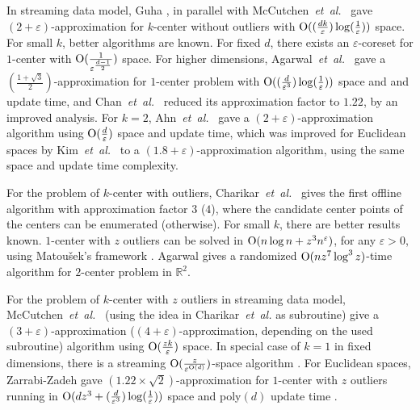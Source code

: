\documentclass[envcountsame]{cls/cccg15}
\newcommand{\cO}{\ensuremath{{\rm O}}}
\newcommand{\IR}{\ensuremath{\mathbb{R}}}
\newcommand{\eps}{\varepsilon}
\newcommand{\etal}{{\em et~al.\/}}
\begin{document}
In streaming data model, Guha \cite{guha2009tight}, in parallel with McCutchen~\etal~\cite{mccutchen2008streaming} gave $(2+\eps)$-approximation for $k$-center without outliers with $\cO((\frac{dk}{\eps}) \log(\frac{1}{\eps}))$ space.
For small $k$, better algorithms are known. For fixed $d$, there exists an $\eps$\nobreakdash-coreset for $1$-center with $\cO(\frac{1}{\eps^{\frac{d-1}{2}}})$ space.
For higher dimensions, Agarwal~\etal~\cite{agarwal2010streaming} gave a $(\frac{1+\sqrt{3}}{2})$-approximation for $1$\nobreakdash-center problem with $\cO((\frac{d}{\eps^3})\log(\frac{1}{\eps}))$ space and and update time, and Chan~\etal~\cite{chan2014streaming} reduced its approximation factor to $1.22$, by an improved analysis.
For $k=2$, Ahn~\etal~\cite{ahn2014computing} gave a $(2+\eps)$-approximation algorithm using $\cO(\frac{d}{\eps})$ space and update time, which was improved for Euclidean spaces by Kim~\etal~\cite{kim2014improved} to a $(1.8+\eps)$-approximation algorithm, using the same space and update time complexity.

For the problem of $k$-center with outliers, Charikar~\etal~\cite{charikar2001algorithms} gives the first offline algorithm with approximation factor $3$ ($4$), where the candidate center points of the centers can be enumerated (otherwise).
For small $k$, there are better results known. $1$-center with $z$ outliers can be solved in $\cO(n \log n + z^{3} n^{\eps})$, for any $\eps > 0$, using Matou{\v{s}}ek's framework \cite{matouvsek1995geometric}.
Agarwal \cite{agarwal2008efficient} gives a randomized $\cO(n z^{7} \log^3 z)$-time algorithm for $2$-center problem in $\IR^2$.

For the problem of $k$-center with $z$ outliers in streaming data model, McCutchen~\etal~\cite{mccutchen2008streaming} (using the idea in Charikar~\etal \cite{charikar2001algorithms} as subroutine) give a $(3+\eps)$-approximation ($(4+\eps)$-approximation, depending on the used subroutine) algorithm using $\cO(\frac{zk}{\eps})$ space.
In special case of $k=1$ in fixed dimensions, there is a streaming $\cO(\frac{z}{\eps^{\cO(d)}})$-space algorithm \cite{agarwal2007space, zarrabi2011almost}.
For Euclidean spaces, Zarrabi-Zadeh \cite{zarrabi2009streaming} gave $(1.22 \times \sqrt{2})$\nobreakdash-approximation for $1$-center with $z$ outliers running in $\cO(dz^3 + (\frac{d}{\eps^3})\log(\frac{1}{\eps}))$ space and poly$(d)$ update time .
\end{document}
